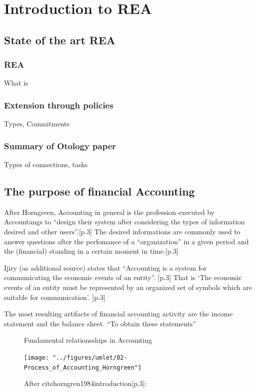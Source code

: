 \chapter{Introduction to REA}\label{chap:IntroREA}


\section{State of the art REA}
\subsection{REA}
What is
\subsection{Extension through policies}
Types, Commitments
\subsection{Summary of Otology paper}
Types of connections, tasks


\section{The purpose of financial Accounting}
After Horngreen, Accounting in general is the profession executed by Accountangs to \enquote{design their system after considering the types of information desired and other users}.\cite{horngren1984introduction}[p.3]
The desired informations are commonly used to answer questions after the perfomance of a \enquote{organization} in a given period and the (financial) standing in a certain moment in time.\cite{horngren1984introduction}[p.3]

Ijiry (as additional source) states that \enquote{Accounting is a system for communicating the economic events of an entity}. \cite{Ijiri1967}[p.3]
That is \enquote*{The economic events of an entity must be represented by an organized set of symbols which are suitable for communication}. \cite{Ijiri1967}[p.3]

The most resulting artifacts of financial accounting activity are the income statement and the balance sheet.
\enquote{To obtain these statements} 


\begin{figure}
	\centering
	\caption{Fundamental relationsships in Accounting}
	\label{fig:accounting-fundamental-relationsships}
	\texttt{[image: "../figures/umlet/02-Process\_of\_Accounting\_Horngreen"]}
	\caption*{After cite{horngren1984introduction}[p.3]: }
\end{figure}

